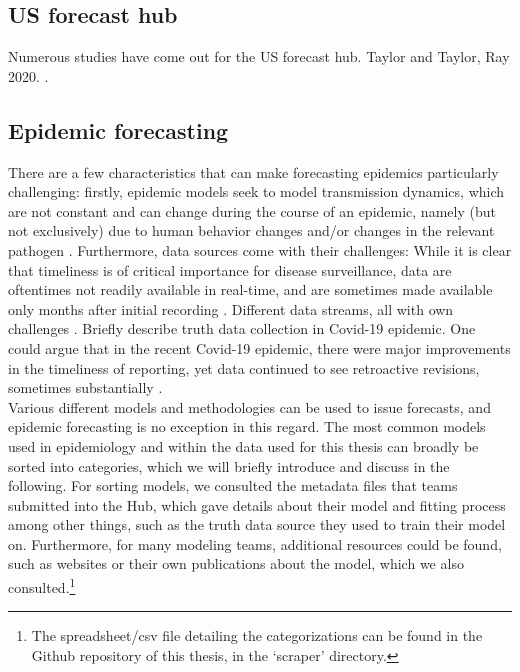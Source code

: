 \subsection{US forecast hub}
Numerous studies have come out for the US forecast hub. Taylor and Taylor, Ray 2020. \cite{ray_ensemble_2020}.
\subsection{Epidemic forecasting}
There are a few characteristics that can make forecasting epidemics particularly challenging: firstly, epidemic models seek to model transmission dynamics, which are not constant and can change during the course of an epidemic, namely (but not exclusively) due to human behavior changes and/or changes in the relevant pathogen \citep{moran_epidemic_2016}. Furthermore, data sources come with their challenges: While it is clear that timeliness is of critical importance for disease surveillance, data are oftentimes not readily available in real-time, and are sometimes made available only months after initial recording \cite{jajosky_evaluation_2004} . Different data streams, all with own challenges \cite{moran_epidemic_2016}. Briefly describe truth data collection in Covid-19 epidemic. One could argue that in the recent Covid-19 epidemic, there were major improvements in the timeliness of reporting, yet data continued to see retroactive revisions, sometimes substantially . \\
Various different models and methodologies can be used to issue forecasts, and epidemic forecasting is no exception in this regard. The most common models used in epidemiology and within the data used for this thesis can broadly be sorted into categories, which we will briefly introduce and discuss in the following. For sorting models, we consulted the metadata files that teams submitted into the Hub, which gave details about their model and fitting process among other things, such as the truth data source they used to train their model on. Furthermore, for many modeling teams, additional resources could be found, such as websites or their own publications about the model, which we also consulted.\footnote{The spreadsheet/csv file detailing the categorizations can be found in the Github repository of this thesis, in the `scraper' directory.} %
